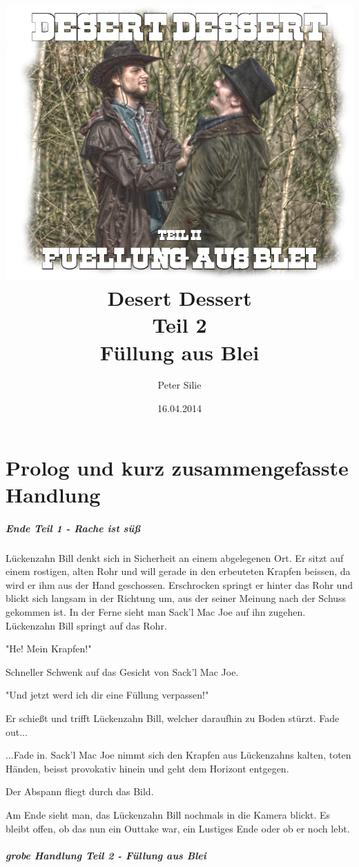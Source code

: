 \documentclass[10pt,a4paper,draft]{book}
\author{Peter Silie}
\title{	\includegraphics[scale=0.5]{titelbild.png}\\
		\vspace{1cm}
		Desert Dessert\\Teil 2\\Füllung aus Blei
		}
\date{16.04.2014}
\begin{document}
\maketitle
\chapter{Prolog und kurz zusammengefasste Handlung}
\paragraph{Ende Teil 1 - Rache ist süß}

Lückenzahn Bill denkt sich in Sicherheit an einem abgelegenen Ort. Er sitzt auf einem rostigen, alten Rohr und will gerade in den erbeuteten Krapfen beissen, da wird er ihm aus der Hand geschossen. Erschrocken springt er hinter das Rohr und blickt sich langsam in der Richtung um, aus der seiner Meinung nach der Schuss gekommen ist. In der Ferne sieht man Sack'l Mac Joe auf ihn zugehen. Lückenzahn Bill springt auf das Rohr.

"He! Mein Krapfen!"

Schneller Schwenk auf das Gesicht von Sack'l Mac Joe.

"Und jetzt werd ich dir eine Füllung verpassen!"

Er schießt und trifft Lückenzahn Bill, welcher daraufhin zu Boden stürzt. Fade out...

...Fade in. Sack'l Mac Joe nimmt sich den Krapfen aus Lückenzahns kalten, toten Händen, beisst provokativ hinein und geht dem Horizont entgegen.

Der Abspann fliegt durch das Bild.

Am Ende sieht man, das Lückenzahn Bill nochmals in die Kamera blickt. Es bleibt offen, ob das nun ein Outtake war, ein Lustiges Ende oder ob er noch lebt.

\paragraph{grobe Handlung Teil 2 - Füllung aus Blei}
\end{document}
